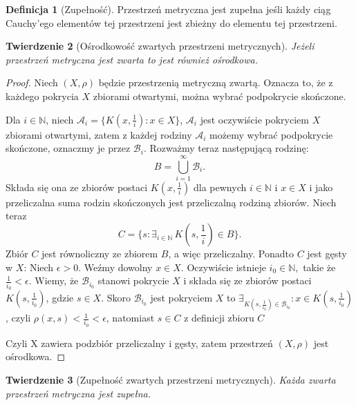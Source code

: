 \documentclass[licencjacka]{pwr_wmat_praca_dyplomowa}
\theoremstyle{plain}
\newtheorem{theorem}{Twierdzenie}
\numberwithin{theorem}{chapter}
\theoremstyle{definition}
\numberwithin{theorem}{chapter}
\newtheorem{definition}[theorem]{Definicja}
\begin{document}
\begin{definition}[Zupełność]
Przestrzeń metryczna jest zupełna jeśli każdy ciąg Cauchy'ego elementów tej przestrzeni jest zbieżny do elementu tej przestrzeni.
\end{definition}


\begin{theorem}[Ośrodkowość zwartych przestrzeni metrycznych] \label{zwarta_jest_osrodkowa}
Jeżeli przestrzeń metryczna jest zwarta to jest również ośrodkowa.
\end{theorem}

\begin{proof}
Niech $(X, \rho)$ będzie przestrzenią metryczną zwartą. Oznacza to, że z każdego pokrycia $X$ zbiorami otwartymi, można wybrać podpokrycie skończone.

Dla $i \in \mathbb{N}$, niech $\mathcal{A}_{i} = \{ K(x, \frac{1}{i}) : x \in X \}$, $\mathcal{A}_{i}$ jest oczywiście pokryciem $X$ zbiorami otwartymi, zatem z każdej rodziny $\mathcal{A}_{i}$ możemy wybrać podpokrycie skończone, oznaczmy je przez $\mathcal{B}_{i}$. Rozważmy teraz następującą rodzinę: 
$$B = \bigcup\limits_{i=1}^{\infty} \mathcal{B}_{i}.$$
Składa się ona ze zbiorów postaci $K(x, \frac{1}{i})$ dla pewnych $i \in \mathbb{N}$ i $x \in X$ i jako przeliczalna suma rodzin skończonych jest przeliczalną rodziną zbiorów.
Niech teraz 
$$C = \{ s : \exists_{i \in \mathbb{N}} \, K\left(s, \frac{1}{i}\right) \in B \}.$$
Zbiór $C$ jest równoliczny ze zbiorem $B$, a więc przeliczalny.
Ponadto $C$ jest gęsty w $X$:
Niech $\epsilon > 0$. Weźmy dowolny $x \in X$. Oczywiście istnieje $i_0 \in \mathbb{N},$ takie że $\frac{1}{i_0} < \epsilon$. Wiemy, że $\mathcal{B}_{i_0}$ stanowi pokrycie $X$ i składa się ze zbiorów postaci $K(s, \frac{1}{i_0})$, gdzie $s \in X$. Skoro $\mathcal{B}_{i_0}$ jest pokryciem $X$ to $\exists_{K(s, \frac{1}{i_0}) \in \mathcal{B}_{i_0}} : x \in K(s, \frac{1}{i_0})$, czyli $\rho(x, s) < \frac{1}{i_0} < \epsilon$, natomiast $s \in C$ z definicji zbioru $C$

Czyli X zawiera podzbiór przeliczalny i gęsty, zatem przestrzeń $(X, \rho)$ jest ośrodkowa.
\end{proof}


\begin{theorem}[Zupełność zwartych przestrzeni metrycznych] \label{zwarta_jest_zupelna}
Każda zwarta przestrzeń metryczna jest zupełna.
\end{theorem}
\end{document}
